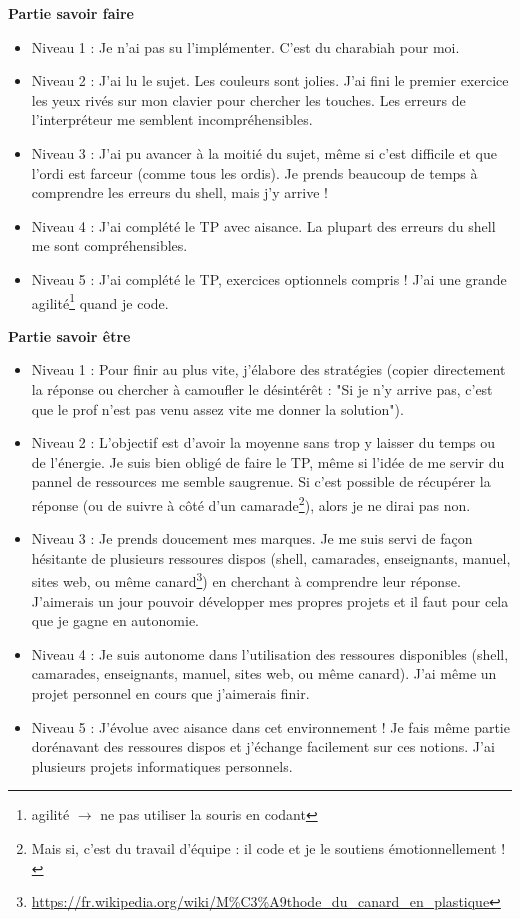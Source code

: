


\textbf{Partie savoir faire}
\begin{itemize}
    \item Niveau 1 : Je n'ai pas su l'implémenter. C'est du charabiah pour moi. 
    \item Niveau 2 : J'ai lu le sujet. Les couleurs sont jolies. J'ai fini le premier exercice les yeux rivés sur mon clavier pour chercher les touches. Les erreurs de l'interpréteur me semblent incompréhensibles.
    \item Niveau 3 : J'ai pu avancer à la moitié du sujet, même si c'est difficile et que l'ordi est farceur (comme tous les ordis). Je prends beaucoup de temps à comprendre les erreurs du shell, mais j'y arrive !
    \item Niveau 4 : J'ai complété le TP avec aisance. La plupart des erreurs du shell me sont compréhensibles.
    \item Niveau 5 : J'ai complété le TP, exercices optionnels compris ! J'ai une grande agilité\footnote{agilité $\rightarrow$ ne pas utiliser la souris en codant} quand je code. 
\end{itemize}


\textbf{Partie savoir être}
\begin{itemize}
    \item Niveau 1 :  Pour finir au plus vite, j'élabore des stratégies (copier directement la réponse ou chercher à camoufler le désintérêt : "Si je n'y arrive pas, c'est que le prof n'est pas venu assez vite me donner la solution"). 
    \item Niveau 2 : L'objectif est d'avoir la moyenne sans trop y laisser du temps ou de l'énergie. Je suis bien obligé de faire le TP, même si l'idée de me servir du pannel de ressources me semble saugrenue. Si c'est possible de récupérer la réponse (ou de suivre à côté d'un camarade\footnote{Mais si, c'est du travail d'équipe : il code et je le soutiens émotionnellement !}), alors je ne dirai pas non. 
    \item Niveau 3 : Je prends doucement mes marques. Je me suis servi de façon hésitante de plusieurs ressoures dispos (shell, camarades, enseignants, manuel, sites web, ou même canard\footnote{\url{https://fr.wikipedia.org/wiki/M\%C3\%A9thode_du_canard_en_plastique}}) en cherchant à comprendre leur réponse. J'aimerais un jour pouvoir développer  mes propres projets et il faut pour cela que je gagne en autonomie.
    \item Niveau 4 :   Je suis autonome dans l'utilisation des ressoures disponibles (shell, camarades, enseignants, manuel, sites web, ou même canard\footnotemark[7]). J'ai même un projet personnel en cours que j'aimerais finir.
    \item Niveau 5 : J'évolue avec aisance dans cet environnement ! Je  fais même partie dorénavant des ressoures dispos et  j'échange facilement sur ces notions. J'ai plusieurs projets informatiques personnels. 
\end{itemize}

